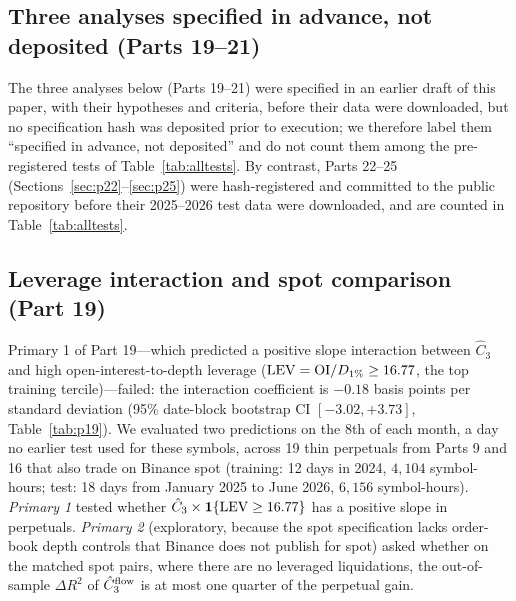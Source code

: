 \documentclass[12pt]{article}
\theoremstyle{definition}
\theoremstyle{remark}
\begin{document}
\FloatBarrier

\subsection{Three analyses specified in advance, not deposited (Parts 19--21)}\label{sec:p1921}
The three analyses below (Parts 19--21) were specified in an earlier draft of this paper, with their hypotheses and criteria, before their data were downloaded, but no specification hash was deposited prior to execution; we therefore label them ``specified in advance, not deposited'' and do not count them among the pre-registered tests of Table~\ref{tab:alltests}. By contrast, Parts 22--25 (Sections~\ref{sec:p22}--\ref{sec:p25}) were hash-registered and committed to the public repository before their 2025--2026 test data were downloaded, and are counted in Table~\ref{tab:alltests}.

\subsection{Leverage interaction and spot comparison (Part 19)}\label{sec:p19}
Primary 1 of Part 19---which predicted a positive slope interaction between $\hat C_3$ and high open-interest-to-depth leverage (${\rm LEV}={\rm OI}/D_{1\%}\ge16.77$, the top training tercile)---failed: the interaction coefficient is $-0.18$ basis points per standard deviation (95\% date-block bootstrap CI $[-3.02,+3.73]$, Table~\ref{tab:p19}). We evaluated two predictions on the 8th of each month, a day no earlier test used for these symbols, across 19 thin perpetuals from Parts 9 and 16 that also trade on Binance spot (training: 12 days in 2024, $4{,}104$ symbol-hours; test: 18 days from January 2025 to June 2026, $6{,}156$ symbol-hours). \emph{Primary 1} tested whether $\hat C_3\times\mathbf{1}\{{\rm LEV}\ge16.77\}$ has a positive slope in perpetuals. \emph{Primary 2} (exploratory, because the spot specification lacks order-book depth controls that Binance does not publish for spot) asked whether on the matched spot pairs, where there are no leveraged liquidations, the out-of-sample $\Delta R^2$ of $\hat C_3^{\rm flow}$ is at most one quarter of the perpetual gain.
\end{document}
